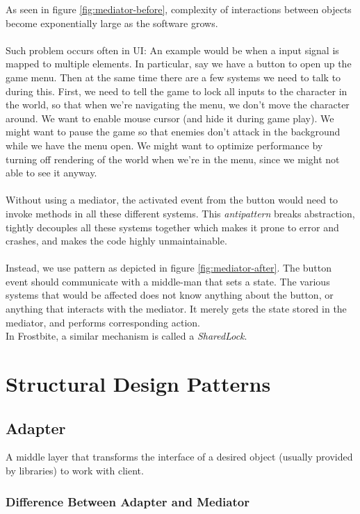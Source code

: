 \documentclass[10pt,letterpaper]{article}
\begin{document}
\begin{multicols}{2}
As seen in figure \ref{fig:mediator-before}, complexity of interactions between objects become exponentially large as the software grows.\\
\\
Such problem occurs often in UI: An example would be when a input signal is mapped to multiple elements. In particular, say we have a button to open up the game menu. Then at the same time there are a few systems we need to talk to during this. First, we need to tell the game to lock all inputs to the character in the world, so that when we're navigating the menu, we don't move the character around. We want to enable mouse cursor (and hide it during game play). We might want to pause the game so that enemies don't attack in the background while we have the menu open. We might want to optimize performance by turning off rendering of the world when we're in the menu, since we might not able to see it anyway.\\
\\
Without using a mediator, the activated event from the button would need to invoke methods in all these different systems. This \textit{antipattern} breaks abstraction, tightly decouples all these systems together which makes it prone to error and crashes, and makes the code highly unmaintainable.\\
\\
Instead, we use pattern as depicted in figure \ref{fig:mediator-after}. The button event should communicate with a middle-man that sets a state. The various systems that would be affected does not know anything about the button, or anything that interacts with the mediator. It merely gets the state stored in the mediator, and performs corresponding action.
\\

In Frostbite, a similar mechanism is called a \textit{SharedLock}. 

\section{Structural Design Patterns}

\subsection{Adapter}

A middle layer that transforms the interface of a desired object (usually provided by libraries) to work with client.

\subsubsection{Difference Between Adapter and Mediator}


\end{multicols}
\end{document}
